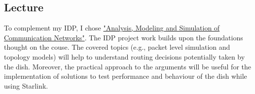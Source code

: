 \documentclass[NET,a4paper,12pt,english]{netforms}
\begin{document}
  \subsection*{Lecture}
  
  To complement my IDP, I chose \href{https://www.ce.cit.tum.de/en/lkn/lehre/vorlesungen/analysis-modeling-and-simulation-of-communication-networks}{"Analysis, Modeling and Simulation of Communication Networks"}. The IDP project work builds upon the foundations thought on the couse. The covered topics (e.g., packet level simulation and topology models) will help to understand routing decisions potentially taken by the dish. Moreover, the practical approach to the arguments will be useful for the implementation of solutions to test performance and behaviour of the dish while using Starlink.


\scriptsize

\end{document}
